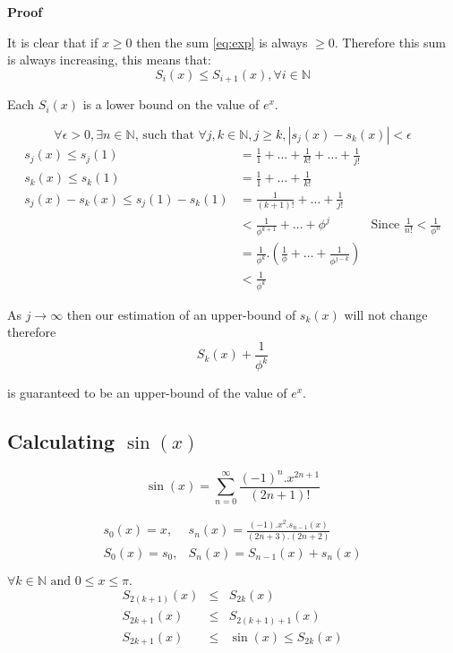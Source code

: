 \documentclass{cs4rep}
\begin{document}
{\bf Proof}

It is clear that if $x \geq 0$ then the sum \ref{eq:exp} is always $\geq 0$. Therefore this sum is always increasing, this means that:
\[ S_{i}(x) \leq S_{i+1}(x), \forall i \in \mathbb{N} \]

Each $S_{i}(x)$ is a lower bound on the value of $e^{x}$.

\[ \forall \epsilon > 0, \exists n \in \mathbb{N} \mbox{, such that } \forall j,k \in \mathbb{N}, j \geq k, |s_{j}(x) - s_{k}(x)| < \epsilon \]
\[ \begin{array}{rll}
s_{j}(x) \leq s_{j}(1) & = \frac{1}{1} + \ldots + \frac{1}{k!} + \ldots + \frac{1}{j!} \\
s_{k}(x) \leq s_{k}(1) & = \frac{1}{1} + \ldots + \frac{1}{k!} \\
s_{j}(x) - s_{k}(x) \leq s_{j}(1) - s_{k}(1) & =  \frac{1}{(k+1)!} + \ldots + \frac{1}{j!} \\
& < \frac{1}{\phi^{k+1}} + \ldots + \phi^{j} & \mbox{Since } \frac{1}{n!} < \frac{1}{\phi^{n}} \\
& = \frac{1}{\phi^{k}}.(\frac{1}{\phi} + \ldots + \frac{1}{\phi^{j-k}}) \\
& < \frac{1}{\phi^{k}}
\end{array} \]

As $j \rightarrow \infty$ then our estimation of an upper-bound of
$s_{k}(x)$ will not change therefore \[ S_{k}(x) + \frac{1}{\phi^{k}}
\] 

is guaranteed to be an upper-bound of the value of $e^{x}$.

\subsection*{Calculating $\sin(x)$}
\[ \sin(x) = \sum_{n=0}^{\infty} \frac{(-1)^{n}.x^{2n+1}}{(2n+1)!} \]

\[ \begin{array}{ll}
s_{0}(x) = x, & s_{n}(x) = \frac{(-1).x^{2}.s_{n-1}(x)}{(2n+3).(2n+2)} \\
S_{0}(x) = s_{0}, & S_{n}(x) = S_{n-1}(x) + s_{n}(x)
\end{array} \]

\begin{myprop}

$ \forall k \in \mathbb{N} \mbox{ and } 0 \leq x \leq \pi. $
\begin{eqnarray}
S_{2(k+1)}(x) & \leq & S_{2k}(x) \label{eq:sin1} \\
S_{2k+1}(x) & \leq & S_{2(k+1)+1}(x) \label{eq:sin2} \\
S_{2k+1}(x) & \leq & \sin(x) \leq S_{2k}(x) \label{eq:sin3}
\end{eqnarray}

\end{myprop}
\end{document}
